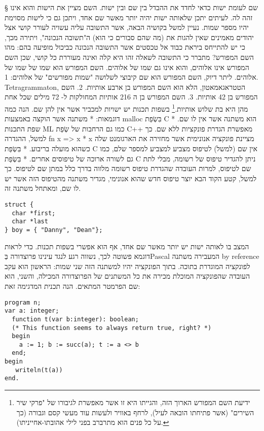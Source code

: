       § שם לעומת ישות
      כדאי לחדד את ההבדל בין שם ובין ישות. השם מציין את הישות והוא אינו זהה לה. לעיתים יתכן שלאותה ישות יהיה יותר מאשר שם אחד, ויתכן גם כי לישות מסוימת יהיו מספר שמות.
      נעיין למשל בקושיה הבאה, אשר התשובה עליה עשויה לעורר קושי אצל יהודים מאמינים שאין להגות את (מה שהם סבורים כי הוא) ה"תשובה הנכונה", ויתירה מכך, כי יש להתייחס ביראת כבוד אל טכסטים אשר התשובה הנכונה כביכול מופיעה בהם:
      מהו השם המפורש?
      מתברר כי התשובה לשאלה זהו היא קלה ואינה מעוררת כל קושי, שכן השם המפורש אינו אלוהים, והוא אינו גם שמו של אלוהים. השם המפורש הוא שמו של שמו של אלוהים. ליתר דיוק, השם המפורש הוא שם קיבוצי לשלושה "שמות מפורשים" של אלוהים:
      1. Tetragrammaton, הטטראגאמאטון, הלא הוא השם המפורש בן ארבע אותיות.
      2. השם המפורש בן 42 אותיות.
      3. השם המפורש בן ה 216 אותיות המחולקות ל- 72 מילים שכל אחת מהן היא בת שלוש אותיות.\footnote{ידיעת השם המפורש הארוך הזה, והגייתו היא זו אשר מאפשרת לגיבורו של "פרקי שיר השירים" (אשר פתיחתו הובאה לעיל), לרחף באוויר ולעשות עוד מעשי קסם וגבורה (כך על כל פנים הוא מתרברב  בפני לילי אהובתו-אחייניתו).}
      בשפות תכנות יש ישויות למכביר אשר אין להן שם. הנה כמה דוגמאות:
      * משתנה אשר הוקצה באמצעות malloc בִּשְׂפַת C הוא משתנה אשר אין לו שם.
      * שפת התכנות ML כמו גם הרחבות של שְׂפַת C++ מאפשרת הגדרת פונקציות ללא שם.
      כך למשל, ההגדרה
      fn x => x * x
      מציינת פונקציה אנונימית אשר מחזירה את הארגומנט שלה כשהוא מועלה בריבוע.
      * בִּשְׂפַת C אין שם (למשל) לטיפוס מצביע למצביע למספר שלם, כמו גם לשורה ארוכה של טיפוסים אחרים.
      * בִּשְׂפַת C ניתן להגדיר טיפוס של רשומה, מבלי לתת שם לטיפוס, למרות העובדה שהגדרת טיפוס רשומה מלווה בדרך כלל במתן שם לטיפוס.
      כך למשל, קטע הקוד הבא יוצר טיפוס חדש שהוא אנונימי, מגדיר משתנה מהטיפוס הזה אשר יש לו שם, ומאתחל משתנה זה.

      \begin{verbatim}
struct { 
  char *first; 
  char *last
} boy = { "Danny", "Dean"}; 
      \end{verbatim}


      המצב בו לאותה ישות יש יותר מאשר שם אחד, אף הוא אפשרי בשפות תכנות. כדי לראות
      דוגמא פשוטה לכך, נשווה רגע לנגד עינינו פרוצדורה בְּPascal המעבירה משתנה by
      reference לפונקציה המוגדרת בתוכה. בתוך הפונקציה יהיו למשתנה הזה שני שמות:
      הראשון הוא עקב העובדה שהפונקציה המוכלת מכירה את כל המשתנים של הפרוצדורה המכילה,
      והשני, הוא שם הפרמטר המתאים. הנה תכנית המדגימה זאת:

      \begin{verbatim}
program n;
var a: integer;
  function t(var b:integer): boolean;
  (* This function seems to always return true, right? *)
  begin
    a := 1; b := succ(a); t := a <> b
  end;
begin
   writeln(t(a))
end.
      \end{verbatim}



